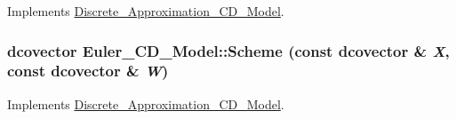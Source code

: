 Implements \hyperlink{class_discrete___approximation___c_d___model_7a3dcae055d90be0b8a231eff961e2a2}{Discrete\_\-Approximation\_\-CD\_\-Model}.\hypertarget{class_euler___c_d___model_c113d0fdd6ba262f11ddfc0446827469}{
\subsubsection[{Scheme}]{\setlength{\rightskip}{0pt plus 5cm}dcovector Euler\_\-CD\_\-Model::Scheme (const dcovector \& {\em X}, \/  const dcovector \& {\em W})}}
\label{class_euler___c_d___model_c113d0fdd6ba262f11ddfc0446827469}




Implements \hyperlink{class_discrete___approximation___c_d___model_1ea9a1d618890fc51db6fa98eeb7af7f}{Discrete\_\-Approximation\_\-CD\_\-Model}.